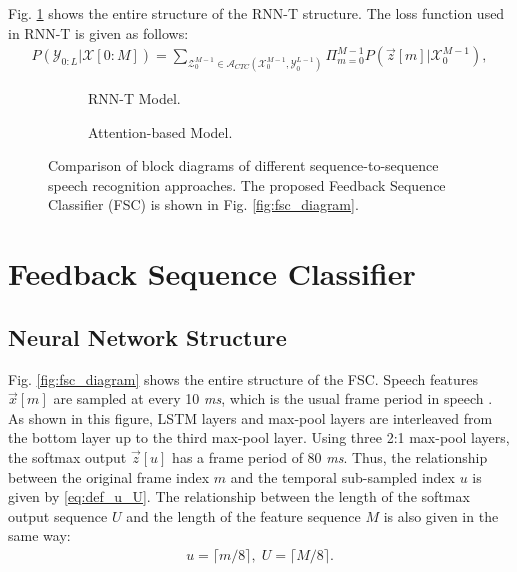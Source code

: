 \documentclass{article}
\begin{document}
Fig. \ref{fig:rnn_t_diagram} shows the entire structure of the  
RNN-T structure. The loss function used in RNN-T is given as follows:
\begin{align}
  P\left(\mathcal{Y}_{0:L} | \mathcal{X}[0:M]\right) = 
    \sum_{\mathcal{Z}_{0}^{M-1} \in 
      \mathcal{A}_{CTC} 
        \left(\mathcal{X}_{0}^{M-1}, \mathcal{Y}_{0}^{L-1} \right)}
          \Pi_{m=0}^{M-1}
            P\left(\vec{z}[m] | \mathcal{X}_{0}^{M-1} \right),
\end{align}


\begin{figure}
  \centering
  \begin{subfigure}[b]{0.60\textwidth}
    \centering
    \resizebox{78mm}{!}{
      
    }
    \caption {
      RNN-T Model.
      \label{fig:rnn_t_diagram}
    }
  \end{subfigure}

  \begin{subfigure}[b]{0.55\textwidth}
    \centering
    \resizebox{53mm}{!}{
      
    }
    \caption {
      Attention-based Model.
      \label{fig:attention_diagram}
    }
  \end{subfigure}
  \caption{
    Comparison of block diagrams of different sequence-to-sequence speech
    recognition approaches.
    The proposed Feedback Sequence Classifier (FSC) is shown in 
    Fig. \ref{fig:fsc_diagram}.
  }

\end{figure}




\section{Feedback Sequence Classifier}
\label{sec:feedback_sequence_classifier}


\subsection{Neural Network Structure}
\label{sec:neural_network_structure}
Fig. \ref{fig:fsc_diagram} shows the entire structure of the FSC. 
Speech features $\vec{x}[m]$ are sampled 
at every 10 {\it ms}, which is the usual frame period in speech 
\cite{x_huang_prentice_hall_2001_00, c_kim_taslp_2016_00}.
As shown in this figure, LSTM layers and max-pool layers
are interleaved from the bottom layer up to the third max-pool layer.
Using three 2:1 max-pool layers, the softmax output $\vec{z}[u]$ has 
a frame period of 80 {\it ms}.  Thus, the relationship between the original frame 
index $m$ and the temporal sub-sampled index $u$ is given by \eqref{eq:def_u_U}.
The relationship between the length of the softmax output sequence $U$
and the length of the feature sequence $M$ is also given in the same way:
	\begin{align}
		u = \lceil m / 8 \rceil,  \; U = \lceil M / 8 \rceil \label{eq:def_u_U}.
	\end{align}
\end{document}
